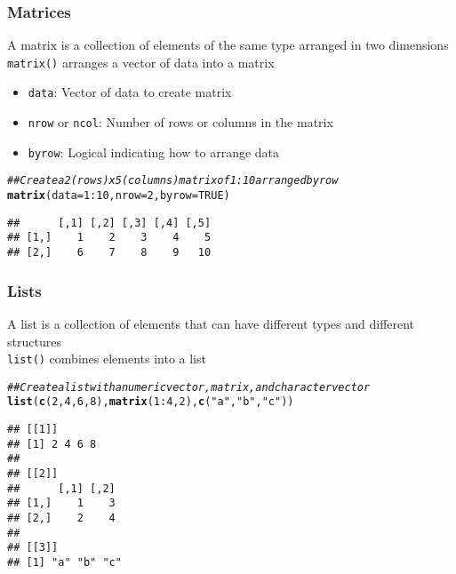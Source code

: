 \documentclass{beamer}\usepackage[]{graphicx}\usepackage[]{color}
\makeatletter
\newcommand{\hlnum}[1]{\textcolor[rgb]{0.686,0.059,0.569}{#1}}%
\newcommand{\hlstr}[1]{\textcolor[rgb]{0.192,0.494,0.8}{#1}}%
\newcommand{\hlcom}[1]{\textcolor[rgb]{0.678,0.584,0.686}{\textit{#1}}}%
\newcommand{\hlopt}[1]{\textcolor[rgb]{0,0,0}{#1}}%
\newcommand{\hlstd}[1]{\textcolor[rgb]{0.345,0.345,0.345}{#1}}%
\newcommand{\hlkwc}[1]{\textcolor[rgb]{0.333,0.667,0.333}{#1}}%
\newcommand{\hlkwd}[1]{\textcolor[rgb]{0.737,0.353,0.396}{\textbf{#1}}}%
\newenvironment{kframe}{%
 \def\at@end@of@kframe{}%
 \ifinner\ifhmode%
  \def\at@end@of@kframe{\end{minipage}}%
  \begin{minipage}{\columnwidth}%
 \fi\fi%
 \def\FrameCommand##1{\hskip\@totalleftmargin \hskip-\fboxsep
 \colorbox{shadecolor}{##1}\hskip-\fboxsep
     \hskip-\linewidth \hskip-\@totalleftmargin \hskip\columnwidth}%
 \MakeFramed {\advance\hsize-\width
   \@totalleftmargin\z@ \linewidth\hsize
   \@setminipage}}%
 {\par\unskip\endMakeFramed%
 \at@end@of@kframe}
\newenvironment{knitrout}{}{} %
\makeatother
\begin{document}
\begin{frame}[fragile]\frametitle{Matrices}
    A matrix is a collection of elements of the same type arranged in two dimensions \\
    \vspace{3ex}
    \texttt{matrix()} arranges a vector of data into a matrix
    \begin{itemize}
        \item \texttt{data}: Vector of data to create matrix
        \item \texttt{nrow} or \texttt{ncol}: Number of rows or columns in the matrix
        \item \texttt{byrow}: Logical indicating how to arrange data
    \end{itemize}
\begin{knitrout}\footnotesize
{}\color{fgcolor}\begin{kframe}
\begin{alltt}
\hlcom{## Create a 2 (rows) x 5 (columns) matrix of 1:10 arranged by row}
\hlkwd{matrix}\hlstd{(}\hlkwc{data} \hlstd{=} \hlnum{1}\hlopt{:}\hlnum{10}\hlstd{,} \hlkwc{nrow} \hlstd{=} \hlnum{2}\hlstd{,} \hlkwc{byrow} \hlstd{=} \hlnum{TRUE}\hlstd{)}
\end{alltt}
\begin{verbatim}
##      [,1] [,2] [,3] [,4] [,5]
## [1,]    1    2    3    4    5
## [2,]    6    7    8    9   10
\end{verbatim}
\end{kframe}
\end{knitrout}
\end{frame}

\begin{frame}[fragile]\frametitle{Lists}
    A list is a collection of elements that can have different types and different structures \\
    \vspace{3ex}
    \texttt{list()} combines elements into a list
\begin{knitrout}\footnotesize
{}\color{fgcolor}\begin{kframe}
\begin{alltt}
\hlcom{## Create a list with a numeric vector, matrix, and character vector}
\hlkwd{list}\hlstd{(}\hlkwd{c}\hlstd{(}\hlnum{2}\hlstd{,} \hlnum{4}\hlstd{,} \hlnum{6}\hlstd{,} \hlnum{8}\hlstd{),} \hlkwd{matrix}\hlstd{(}\hlnum{1}\hlopt{:}\hlnum{4}\hlstd{,} \hlnum{2}\hlstd{),} \hlkwd{c}\hlstd{(}\hlstr{"a"}\hlstd{,} \hlstr{"b"}\hlstd{,} \hlstr{"c"}\hlstd{))}
\end{alltt}
\begin{verbatim}
## [[1]]
## [1] 2 4 6 8
## 
## [[2]]
##      [,1] [,2]
## [1,]    1    3
## [2,]    2    4
## 
## [[3]]
## [1] "a" "b" "c"
\end{verbatim}
\end{kframe}
\end{knitrout}
\end{frame}
\end{document}
